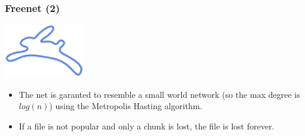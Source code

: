 \begin{frame}[noframenumbering]
	\frametitle{Freenet (2)}
	\begin{center}
	\includegraphics[scale=0.7]{imgs/Freenet_logo}
	\end{center}
	\begin{itemize}
		\item The net is garanted to resemble a small world network (so the max degree is
		$log(n)$) using the Metropolis Hasting algorithm.
		\item If a file is not popular and only a chunk is lost, the
		file is lost forever.
	\end{itemize}
\end{frame}
